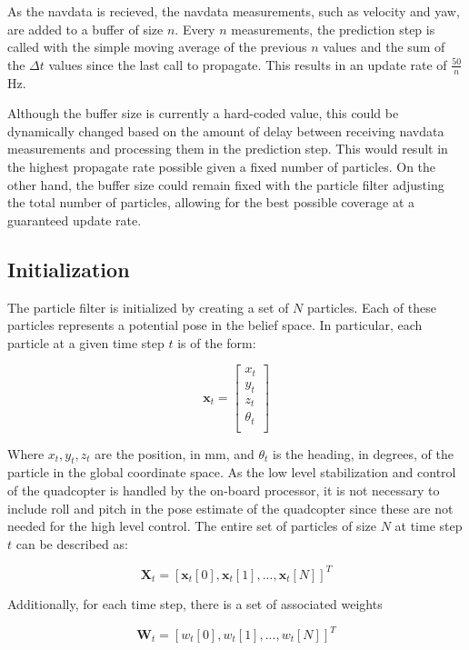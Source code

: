 		As the navdata is recieved, the navdata measurements, such as velocity and yaw, are added to a buffer of size $n$. Every $n$ measurements, the prediction step is called with the simple moving average of the previous $n$ values and the sum of the $\Delta t$ values since the last call to propagate. This results in an update rate of $\frac{50}{n}$Hz.

		Although the buffer size is currently a hard-coded value, this could be dynamically changed based on the amount of delay between receiving navdata measurements and processing them in the prediction step. This would result in the highest propagate rate possible given a fixed number of particles. On the other hand, the buffer size could remain fixed with the particle filter adjusting the total number of particles, allowing for the best possible coverage at a guaranteed update rate.

	\subsection{Initialization}

		The particle filter is initialized by creating a set of $N$ particles. Each of these particles represents a potential pose in the belief space. In particular, each particle at a given time step $t$ is of the form:

		\[\textbf{x}_t = \begin{bmatrix} 
			  x_t\\
			  y_t\\
			  z_t\\
			  \theta_t\\
			\end{bmatrix}	
		\]

		Where $x_t, y_t, z_t$ are the position, in mm, and $\theta_t$ is the heading, in degrees, of the particle in the global coordinate space. As the low level stabilization and control of the quadcopter is handled by the on-board processor, it is not necessary to include roll and pitch in the pose estimate of the quadcopter since these are not needed for the high level control. The entire set of particles of size $N$ at time step $t$ can be described as:

		\[
		\textbf{X}_t = [\textbf{x}_t[0], \textbf{x}_t[1],...,\textbf{x}_t[N]]^T
		\]

		Additionally, for each time step, there is a set of associated weights

		\[
		\textbf{W}_t = [w_t[0], w_t[1],...,w_t[N]]^T
		\]

